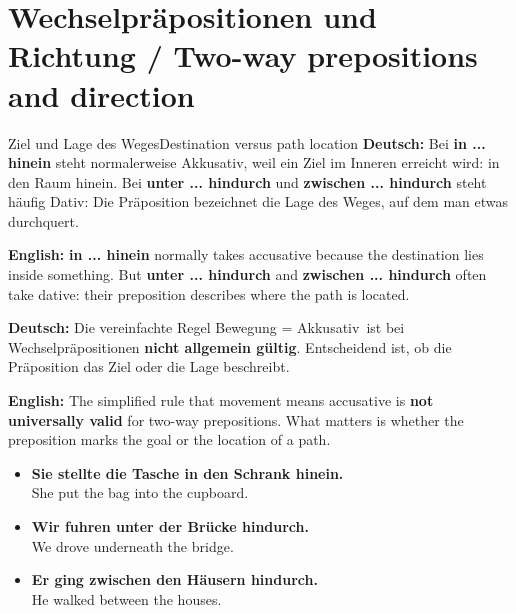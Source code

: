 \documentclass[a4paper,11pt]{article}
\newcommand{\GermanText}[1]{\textbf{Deutsch: }#1\par}
\newcommand{\EnglishText}[1]{{\small\color{SoftGray}\textbf{English: }#1\par}}
\newcommand{\ExampleItem}[2]{\item \textbf{#1}\\{\small\color{SoftGray}#2}}
\begin{document}
\section{Wechselpräpositionen und Richtung / Two-way prepositions and direction}
\begin{grammarentry}{Ziel und Lage des Weges}{Destination versus path location}
\GermanText{Bei \textbf{in ... hinein} steht normalerweise Akkusativ, weil ein Ziel im Inneren erreicht wird: \glqq in den Raum hinein\grqq. Bei \textbf{unter ... hindurch} und \textbf{zwischen ... hindurch} steht häufig Dativ: Die Präposition bezeichnet die Lage des Weges, auf dem man etwas durchquert.}
\EnglishText{\textbf{in ... hinein} normally takes accusative because the destination lies inside something. But \textbf{unter ... hindurch} and \textbf{zwischen ... hindurch} often take dative: their preposition describes where the path is located.}
\GermanText{Die vereinfachte Regel \glqq Bewegung = Akkusativ\grqq\ ist bei Wechselpräpositionen \textbf{nicht allgemein gültig}. Entscheidend ist, ob die Präposition das Ziel oder die Lage beschreibt.}
\EnglishText{The simplified rule that movement means accusative is \textbf{not universally valid} for two-way prepositions. What matters is whether the preposition marks the goal or the location of a path.}
\end{grammarentry}
\begin{exbox}\begin{itemize}
\ExampleItem{Sie stellte die Tasche in den Schrank hinein.}{She put the bag into the cupboard.}
\ExampleItem{Wir fuhren unter der Brücke hindurch.}{We drove underneath the bridge.}
\ExampleItem{Er ging zwischen den Häusern hindurch.}{He walked between the houses.}
\end{itemize}\end{exbox}
\end{document}
